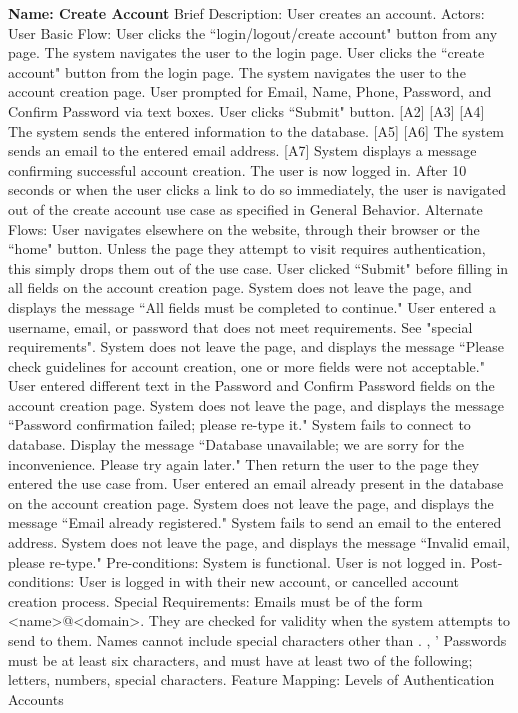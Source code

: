 \begin{outline}[enumerate]
\1 {\bf Name: Create Account}
\2 Brief Description: User creates an account.
\2 Actors: User
\2 Basic Flow:
\3 User clicks the ``login/logout/create account" button from any page.
\3 The system navigates the user to the login page.
\3 User clicks the ``create account" button from the login page.
\3 The system navigates the user to the account creation page.
\3 User prompted for Email, Name, Phone, Password, and Confirm Password via text boxes.
\3 User clicks ``Submit" button. [A2] [A3] [A4]
\3 The system sends the entered information to the database. [A5] [A6]
\3 The system sends an email to the entered email address. [A7]
\3 System displays a message confirming successful account creation.  The user is now logged in.
\3 After 10 seconds or when the user clicks a link to do so immediately, the user is navigated out of the create account use case as specified in General Behavior.
\2 Alternate Flows:
\3 [A1] User navigates elsewhere on the website, through their browser or the ``home" button.  Unless the page they attempt to visit requires authentication, this simply drops them out of the use case.
\3 [A2] User clicked ``Submit" before filling in all fields on the account creation page.  System does not leave the page, and displays the message ``All fields must be completed to continue."
\3 [A3] User entered a username, email, or password that does not meet requirements.  See "special requirements".  System does not leave the page, and displays the message ``Please check guidelines for account creation, one or more fields were not acceptable."
\3 [A4] User entered different text in the Password and Confirm Password fields on the account creation page.  System does not leave the page, and displays the message ``Password confirmation failed; please re-type it."
\3 [A5] System fails to connect to database.  Display the message ``Database unavailable; we are sorry for the inconvenience.  Please try again later."  Then return the user to the page they entered the use case from.
\3 [A6] User entered an email already present in the database on the account creation page.  System does not leave the page, and displays the message ``Email already registered."
\3 [A7] System fails to send an email to the entered address.  System does not leave the page, and displays the message ``Invalid email, please re-type."
\2 Pre-conditions:
\3 System is functional.
\3 User is not logged in.
\2 Post-conditions:
\3 User is logged in with their new account, or cancelled account creation process.
\2 Special Requirements:
\3 Emails must be of the form <name>@<domain>.  They are checked for validity when the system attempts to send to them.
\3 Names cannot include special characters other than . , '
\3 Passwords must be at least six characters, and must have at least two of the following; letters, numbers, special characters.
\2 Feature Mapping:
\3 Levels of Authentication
\3 Accounts

\end{outline}

